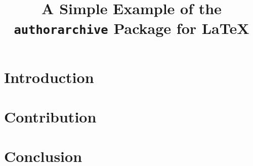 \documentclass[conference]{IEEEtran}
\title{A Simple Example of the \texttt{authorarchive} Package for \LaTeX}
\author{%
    \IEEEauthorblockN{\protect\href{http://www.brucker.ch/}{Achim D. Brucker}}
    \IEEEauthorblockA{Some Departement \\ Somewhere}
}
\begin{document}
  \maketitle{}

  \begin{abstract}
      \lipsum[1-2]
  \end{abstract}

  \section{Introduction}
  \lipsum[1-4]

  \section{Contribution}
  \lipsum[5-10]

  \section{Conclusion}
  \lipsum[11-12]
\end{document}
